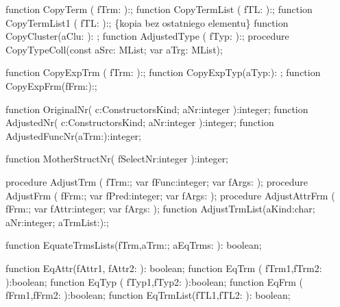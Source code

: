 function CopyTerm ( fTrm: ):;
function CopyTermList ( fTL: ):;
function CopyTermList1 ( fTL: ):; \{kopia bez ostatniego elementu\}
function CopyCluster(aClu: ): ;
function AdjustedType ( fTyp: ):;
procedure CopyTypeColl(const aSrc: MList; var aTrg: MList);

function CopyExpTrm ( fTrm: ):;
function CopyExpTyp(aTyp:): ;
function CopyExpFrm(fFrm:):;

function OriginalNr( c:ConstructorsKind; aNr:integer ):integer;
function AdjustedNr( c:ConstructorsKind; aNr:integer ):integer;
function AdjustedFuncNr(aTrm:):integer;

function MotherStructNr( fSelectNr:integer ):integer;

procedure AdjustTrm ( fTrm:; var fFunc:integer; var fArgs: );
procedure AdjustFrm ( fFrm:; var fPred:integer; var fArgs: );
procedure AdjustAttrFrm ( fFrm:; var fAttr:integer; var fArgs: );
function AdjustTrmList(aKind:char; aNr:integer; aTrmList:):;

function EquateTrmsLists(fTrm,aTrm:; aEqTrms: ): boolean;

function EqAttr(fAttr1, fAttr2: ): boolean;
function EqTrm ( fTrm1,fTrm2: ):boolean;
function EqTyp ( fTyp1,fTyp2: ):boolean;
function EqFrm ( fFrm1,fFrm2: ):boolean;
function EqTrmList(fTL1,fTL2: ): boolean;


